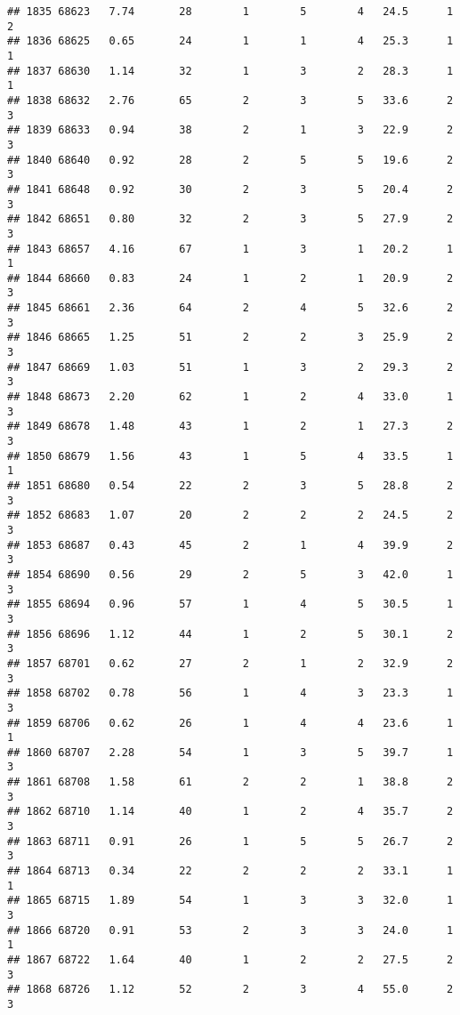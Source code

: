 \documentclass[
]{article}
\begin{document}
\begin{verbatim}
## 1835 68623   7.74       28        1        5        4   24.5      1      2
## 1836 68625   0.65       24        1        1        4   25.3      1      1
## 1837 68630   1.14       32        1        3        2   28.3      1      1
## 1838 68632   2.76       65        2        3        5   33.6      2      3
## 1839 68633   0.94       38        2        1        3   22.9      2      3
## 1840 68640   0.92       28        2        5        5   19.6      2      3
## 1841 68648   0.92       30        2        3        5   20.4      2      3
## 1842 68651   0.80       32        2        3        5   27.9      2      3
## 1843 68657   4.16       67        1        3        1   20.2      1      1
## 1844 68660   0.83       24        1        2        1   20.9      2      3
## 1845 68661   2.36       64        2        4        5   32.6      2      3
## 1846 68665   1.25       51        2        2        3   25.9      2      3
## 1847 68669   1.03       51        1        3        2   29.3      2      3
## 1848 68673   2.20       62        1        2        4   33.0      1      3
## 1849 68678   1.48       43        1        2        1   27.3      2      3
## 1850 68679   1.56       43        1        5        4   33.5      1      1
## 1851 68680   0.54       22        2        3        5   28.8      2      3
## 1852 68683   1.07       20        2        2        2   24.5      2      3
## 1853 68687   0.43       45        2        1        4   39.9      2      3
## 1854 68690   0.56       29        2        5        3   42.0      1      3
## 1855 68694   0.96       57        1        4        5   30.5      1      3
## 1856 68696   1.12       44        1        2        5   30.1      2      3
## 1857 68701   0.62       27        2        1        2   32.9      2      3
## 1858 68702   0.78       56        1        4        3   23.3      1      3
## 1859 68706   0.62       26        1        4        4   23.6      1      1
## 1860 68707   2.28       54        1        3        5   39.7      1      3
## 1861 68708   1.58       61        2        2        1   38.8      2      3
## 1862 68710   1.14       40        1        2        4   35.7      2      3
## 1863 68711   0.91       26        1        5        5   26.7      2      3
## 1864 68713   0.34       22        2        2        2   33.1      1      1
## 1865 68715   1.89       54        1        3        3   32.0      1      3
## 1866 68720   0.91       53        2        3        3   24.0      1      1
## 1867 68722   1.64       40        1        2        2   27.5      2      3
## 1868 68726   1.12       52        2        3        4   55.0      2      3

\end{verbatim}
\end{document}
